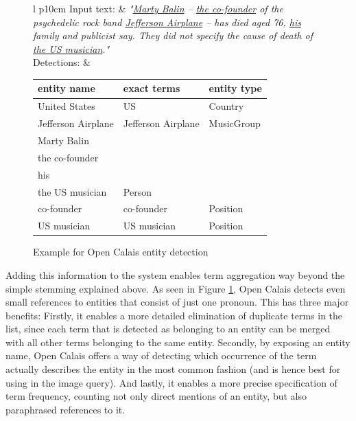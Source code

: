 \documentclass[11pt,a4paper,twoside]{article}
\begin{document}
\begin{figure}[ht]
    \caption{Example for Open Calais entity detection \bigskip}
    \centering
    \begin{tabular}{l p{10cm}}
        Input text: & \nohyphens{\emph{"\underline{Marty Balin} -- \underline{the co-founder} of the psychedelic rock band \underline{Jefferson Airplane} -- has died aged 76, \underline{his} family and publicist say. They did not specify the cause of death of \underline{the US musician}."}} \bigskip \\
        
        Detections: & \begin{tabular}{|l|l|l|}
         \hline
         \textbf{entity name} & \textbf{exact terms}        & \textbf{entity type}       \\
         \hline
         United States      & US                            & Country           \\
         \hline
         Jefferson Airplane & Jefferson Airplane            & MusicGroup        \\
         \hline
         Marty Balin        & \pbox{50cm}{\vspace{.2\baselineskip}Marty Balin\\the co-founder\\his\\the US musician\vspace{.3\baselineskip}} & Person            \\
         \hline
         co-founder & co-founder & Position \\
         \hline
         US musician & US musician & Position \\
         \hline
    \end{tabular}
    \end{tabular}
    \label{table:calais-example}
\end{figure}

Adding this information to the system enables term aggregation way beyond the simple stemming explained above. As seen in Figure \ref{table:calais-example}, Open Calais detects even small references to entities that consist of just one pronoun. This has three major benefits: Firstly, it enables a more detailed elimination of duplicate terms in the list, since each term that is detected as belonging to an entity can be merged with all other terms belonging to the same entity. Secondly, by exposing an entity name, Open Calais offers a way of detecting which occurrence of the term actually describes the entity in the most common fashion (and is hence best for using in the image query). And lastly, it enables a more precise specification of term frequency, counting not only direct mentions of an entity, but also paraphrased references to it.
\end{document}

